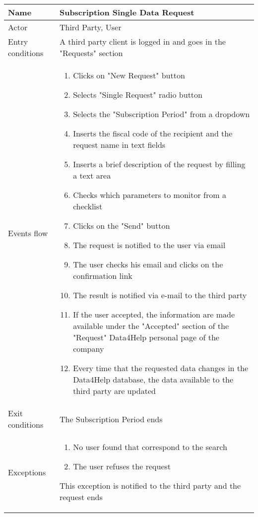 \newpage
\begin{table}[]
\begin{tabular}{|l|p{12cm}|}
\hline
Name             & Subscription Single Data Request \\ \hline
Actor            & Third Party, User \\ \hline
Entry conditions & A third party client is logged in and goes in the "Requests" section\\ \hline
Events flow      & \begin{enumerate}
\item Clicks on "New Request" button
\item Selects "Single Request" radio button
\item Selects the "Subscription Period" from a dropdown
\item Inserts the fiscal code of the recipient and the request name in text fields
\item Inserts a brief description of the request by filling a text area
\item Checks which parameters to monitor from a checklist
\item Clicks on the "Send" button
\item The request is notified to the user via email
\item The user checks his email and clicks on the confirmation link
\item The result is notified via e-mail to the third party
\item If the user accepted, the information are made available under the "Accepted" 
section of the "Request" Data4Help personal page of the company
\item Every time that the requested data changes in the Data4Help database, 
the data available to the third party are updated
\end{enumerate} \\ \hline
Exit conditions  & The Subscription Period ends \\ \hline
Exceptions & \begin{enumerate}
\item No user found that correspond to the search
\item The user refuses the request
\end{enumerate} This exception is notified to the third party and the request ends\\ \hline
\end{tabular}
\end{table}

